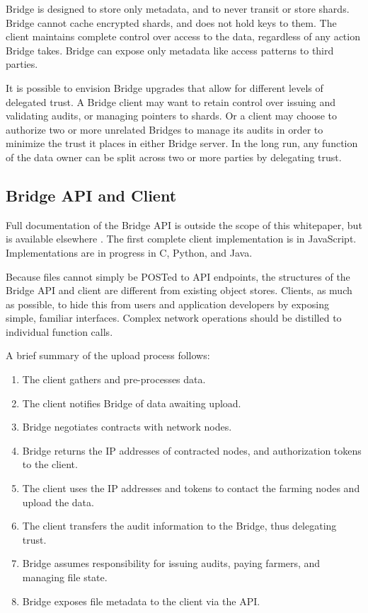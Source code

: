 \documentclass[a4paper,10pt]{article}
\begin{document}
Bridge is designed to store only metadata, and to never transit or store shards. Bridge cannot cache encrypted shards, and does not hold keys to them. The client maintains complete control over access to the data, regardless of any action Bridge takes. Bridge can expose only metadata like access patterns to third parties.

It is possible to envision Bridge upgrades that allow for different levels of delegated trust. A Bridge client may want to retain control over issuing and validating audits, or managing pointers to shards. Or a client may choose to authorize two or more unrelated Bridges to manage its audits in order to minimize the trust it places in either Bridge server. In the long run, any function of the data owner can be split across two or more parties by delegating trust.

\subsection{Bridge API and Client}
Full documentation of the Bridge API is outside the scope of this whitepaper, but is available elsewhere \cite{16}. The first complete client implementation is in JavaScript. Implementations are in progress in C, Python, and Java.

Because files cannot simply be POSTed to API endpoints, the structures of the Bridge API and client are different from existing object stores. Clients, as much as possible, to hide this from users and application developers by exposing simple, familiar interfaces. Complex network operations should be distilled to individual function calls.

A brief summary of the upload process follows:

\begin{enumerate}
\item The client gathers and pre-processes data.
\item The client notifies Bridge of data awaiting upload.
\item Bridge negotiates contracts with network nodes.
\item Bridge returns the IP addresses of contracted nodes, and authorization tokens to the client.
\item The client uses the IP addresses and tokens to contact the farming nodes and upload the data.
\item The client transfers the audit information to the Bridge, thus delegating trust.
\item Bridge assumes responsibility for issuing audits, paying farmers, and managing file state.
\item Bridge exposes file metadata to the client via the API.
\end{enumerate}
\end{document}

